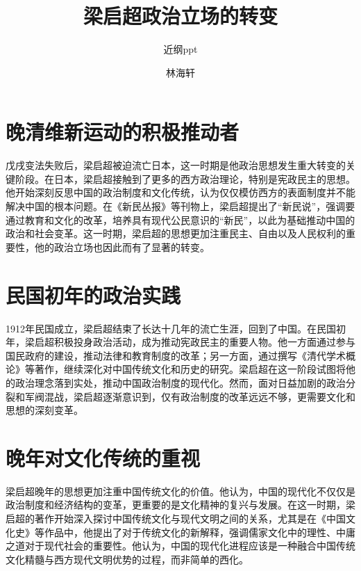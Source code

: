 \documentclass[10pt,a4paper]{beamer} %
\begin{document}
	
	\title{梁启超政治立场的转变}
	\subtitle{近纲ppt}
	\author{林海轩}
	\date{}
	
	\begin{frame}
		\titlepage
	\end{frame}
	
	\begin{frame}
		\tableofcontents
	\end{frame}
	
	
	\section{晚清维新运动的积极推动者}
	\begin{frame}
		戊戌变法失败后，梁启超被迫流亡日本，这一时期是他政治思想发生重大转变的关键阶段。在日本，梁启超接触到了更多的西方政治理论，特别是宪政民主的思想。他开始深刻反思中国的政治制度和文化传统，认为仅仅模仿西方的表面制度并不能解决中国的根本问题。在《新民丛报》等刊物上，梁启超提出了“新民说”，强调要通过教育和文化的改革，培养具有现代公民意识的“新民”，以此为基础推动中国的政治和社会变革。这一时期，梁启超的思想更加注重民主、自由以及人民权利的重要性，他的政治立场也因此而有了显著的转变。
	\end{frame}
	\section{民国初年的政治实践}
	\begin{frame}
		1912年民国成立，梁启超结束了长达十几年的流亡生涯，回到了中国。在民国初年，梁启超积极投身政治活动，成为推动宪政民主的重要人物。他一方面通过参与国民政府的建设，推动法律和教育制度的改革；另一方面，通过撰写《清代学术概论》等著作，继续深化对中国传统文化和历史的研究。梁启超在这一阶段试图将他的政治理念落到实处，推动中国政治制度的现代化。然而，面对日益加剧的政治分裂和军阀混战，梁启超逐渐意识到，仅有政治制度的改革远远不够，更需要文化和思想的深刻变革。
	\end{frame}
	\section{晚年对文化传统的重视}
	\begin{frame}
		梁启超晚年的思想更加注重中国传统文化的价值。他认为，中国的现代化不仅仅是政治制度和经济结构的变革，更重要的是文化精神的复兴与发展。在这一时期，梁启超的著作开始深入探讨中国传统文化与现代文明之间的关系，尤其是在《中国文化史》等作品中，他提出了对于传统文化的新解释，强调儒家文化中的理性、中庸之道对于现代社会的重要性。他认为，中国的现代化进程应该是一种融合中国传统文化精髓与西方现代文明优势的过程，而非简单的西化。
	\end{frame}
\end{document}
